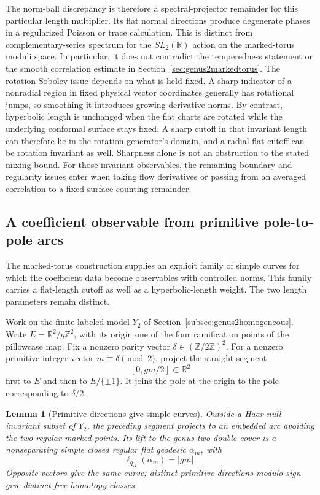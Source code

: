 \documentclass[11pt,a4paper]{article}
\numberwithin{equation}{section}
\newtheorem{lemma}[theorem]{Lemma}
\theoremstyle{definition}
\theoremstyle{remark}
\newcommand{\RR}{\mathbb R}
\newcommand{\ZZ}{\mathbb Z}
\begin{document}
The norm-ball discrepancy is therefore a spectral-projector remainder
for this particular length multiplier. Its flat normal directions
produce degenerate phases in a regularized Poisson or trace calculation.
This is distinct from complementary-series spectrum for the
$SL_2(\RR)$ action on the marked-torus moduli space. In particular, it
does not contradict the temperedness statement or the smooth
correlation estimate in Section~\ref{sec:genus2markedtorus}. The
rotation-Sobolev issue depends on what is held fixed. A sharp indicator
of a nonradial region in fixed physical vector coordinates generally
has rotational jumps, so smoothing it introduces growing derivative
norms. By contrast, hyperbolic length is unchanged when the flat charts
are rotated while the underlying conformal surface stays fixed. A sharp
cutoff in that invariant length can therefore lie in the rotation
generator's domain, and a radial flat cutoff can be rotation invariant
as well. Sharpness alone is not an obstruction to the stated mixing
bound. For those invariant observables, the remaining boundary and
regularity issues enter when taking flow derivatives or passing from
an averaged correlation to a fixed-surface counting remainder.

\subsection{A coefficient observable from primitive pole-to-pole arcs}
\label{subsec:primitivepolebridge}

The marked-torus construction supplies an explicit family of simple curves
for which the coefficient data become observables with controlled norms.
This family carries a flat-length cutoff as well as a hyperbolic-length
weight. The two length parameters remain distinct.

Work on the finite labeled model $Y_2$ of
Section~\ref{subsec:genus2homogeneous}. Write
$E=\RR^2/g\ZZ^2$, with its origin one of the four ramification points
of the pillowcase map. Fix a nonzero parity vector
$\delta\in(\ZZ/2\ZZ)^2$. For a nonzero primitive integer vector
$m\equiv\delta\pmod2$, project the straight segment
\[
 [0,gm/2]\subset\RR^2
\]
first to $E$ and then to $E/\{\pm1\}$. It joins the pole at the
origin to the pole corresponding to $\delta/2$.

\begin{lemma}[Primitive directions give simple curves]
\label{lem:primitivepolearcs}
Outside a Haar-null invariant subset of $Y_2$, the preceding segment
projects to an embedded arc avoiding the two regular marked points.
Its lift to the genus-two double cover is a nonseparating simple
closed regular flat geodesic $\alpha_m$, with
\begin{equation}
 \ell_{q_X}(\alpha_m)=|gm|.
 \label{eq:polearcflatlength}
\end{equation}
Opposite vectors give the same curve; distinct primitive directions
modulo sign give distinct free homotopy classes.
\end{lemma}
\end{document}
